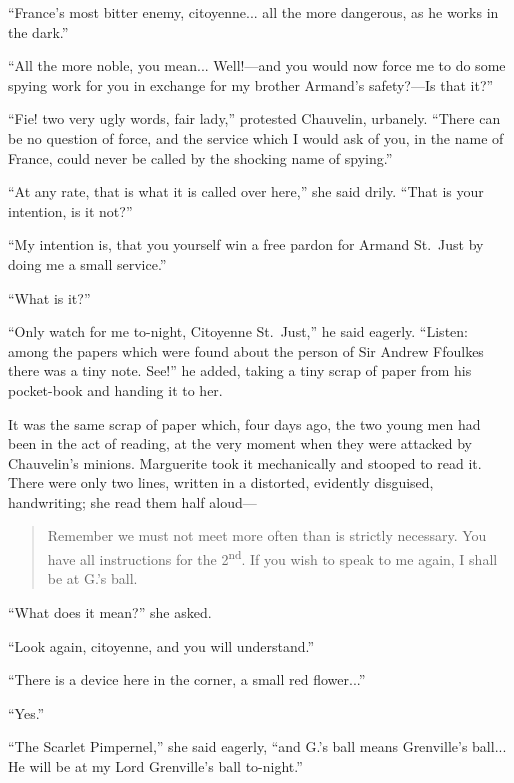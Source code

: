 \documentclass[paper=5.5in:8.5in,BCOR=7mm,twoside,DIV=calc,12pt,usegeometry,chapterprefix,endperiod,headings=big]{scrbook}
\begin{document}
\enquote{France's most bitter enemy, citoyenne... all the more dangerous, as he works in the dark.}

\enquote{All the more noble, you mean... Well!---and you would now force me to do some spying work for you in exchange for my brother Armand's safety?---Is that it?}

\enquote{Fie! two very ugly words, fair lady,} protested Chauvelin, urbanely. \enquote{There can be no question of force, and the service which I would ask of you, in the name of France, could never be called by the shocking name of spying.}

\enquote{At any rate, that is what it is called over here,} she said drily. \enquote{That is your intention, is it not?}

\enquote{My intention is, that you yourself win a free pardon for Armand St.~Just by doing me a small service.}

\enquote{What is it?}

\enquote{Only watch for me to-night, Citoyenne St.~Just,} he said eagerly. \enquote{Listen: among the papers which were found about the person of Sir Andrew Ffoulkes there was a tiny note. See!} he added, taking a tiny scrap of paper from his pocket-book and handing it to her.

It was the same scrap of paper which, four days ago, the two young men had been in the act of reading, at the very moment when they were attacked by Chauvelin's minions. Marguerite took it mechanically and stooped to read it. There were only two lines, written in a distorted, evidently disguised, handwriting; she read them half aloud---

\blockquote{Remember we must not meet more often than is strictly necessary. You have all instructions for the 2\textsuperscript{nd}. If you wish to speak to me again, I shall be at G.'s ball.}

\enquote{What does it mean?} she asked.

\enquote{Look again, citoyenne, and you will understand.}

\enquote{There is a device here in the corner, a small red flower...}

\enquote{Yes.}

\enquote{The Scarlet Pimpernel,} she said eagerly, \enquote{and G.’s ball means Grenville's ball... He will be at my Lord Grenville's ball to-night.}
\end{document}
